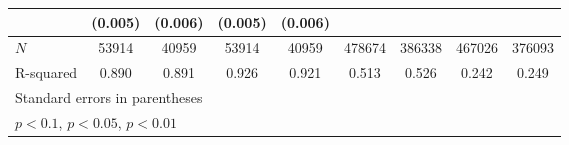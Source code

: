 {\begin{adjustbox}{max width=\textwidth}
\begin{tabular}{l*{8}{c}}
            &     (0.005)         &     (0.006)         &     (0.005)         &     (0.006)         &                     &                     &                     &                     \\
\midrule
\(N\)       &       53914         &       40959         &       53914         &       40959         &      478674         &      386338         &      467026         &      376093         \\
R-squared   &       0.890         &       0.891         &       0.926         &       0.921         &       0.513         &       0.526         &       0.242         &       0.249         \\
\bottomrule
\multicolumn{9}{l}{\footnotesize Standard errors in parentheses}\\
\multicolumn{9}{l}{\footnotesize \sym{*} \(p<0.1\), \sym{**} \(p<0.05\), \sym{***} \(p<0.01\)}\\
\end{tabular}
\end{adjustbox}
}
